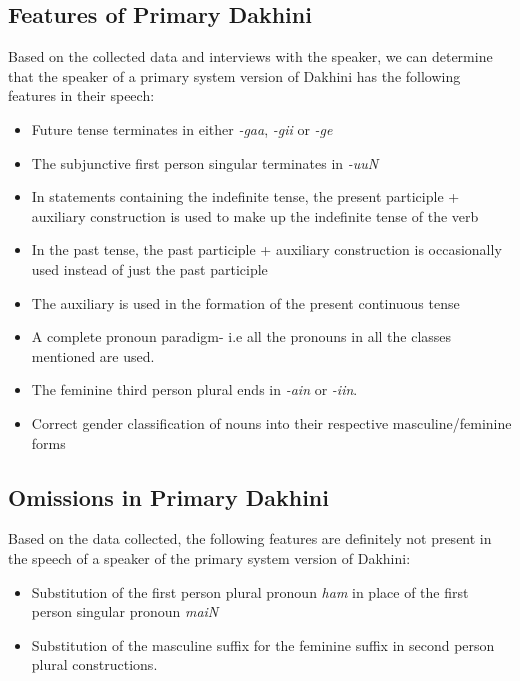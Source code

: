 \documentclass[a4paper]{article}
\begin{document}
\subsection{Features of Primary Dakhini}

Based on the collected data and interviews with the speaker, we can determine that the speaker of a primary system version of Dakhini has the following features in their speech:

\begin{itemize}
\item
Future tense terminates in either \textit{-gaa}, \textit{-gii} or \textit{-ge}
\item
The subjunctive first person singular terminates in \textit{-uuN}
\item
In statements containing the indefinite tense, the present participle + auxiliary construction is used to make up the indefinite tense of the verb
\item
In the past tense, the past participle + auxiliary construction is occasionally used instead of just the past participle
\item
The auxiliary is used in the formation of the present continuous tense
\item
A complete pronoun paradigm- i.e all the pronouns in all the classes mentioned are used.
\item
The feminine third person plural ends in \textit{-ain} or \textit{-iin}.
\item
Correct gender classification of nouns into their respective masculine/feminine forms
\end{itemize}

\subsection{Omissions in Primary Dakhini}

Based on the data collected, the following features are definitely not present in the speech of a speaker of the primary system version of Dakhini:

\begin{itemize}
\item
Substitution of the first person plural pronoun \textit{ham} in place of the first person singular pronoun \textit{maiN}
\item
Substitution of the masculine suffix for the feminine suffix in second person plural constructions.
\end{itemize}
\end{document}
